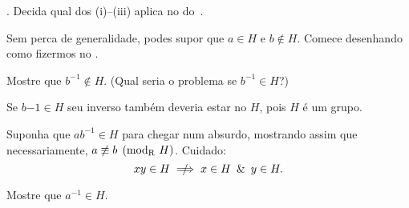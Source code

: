 \exercise.
\label{investigation_of_cong_mod_H_case_2}%
Decida qual dos (i)--(iii) aplica no 
do~.

\hint
Sem perca de generalidade, podes supor que $a \in H$ e $b \notin H$.
Comece desenhando como fizermos no .

\hint
Mostre que $b^{-1}\notin H$.  (Qual seria o problema se $b^{-1} \in H$?)

\hint
Se $b{-1} \in H$ seu inverso também deveria estar no $H$, pois $H$ é um grupo.

\hint
Suponha que $ab^{-1} \in H$ para chegar num absurdo, mostrando assim que necessariamente,
$a \ncong b \pmodr H$.  Cuidado:
$$
xy \in H \nimplies x \in H \mland y \in H.
$$

\hint
Mostre que $a^{-1}\in H$.

